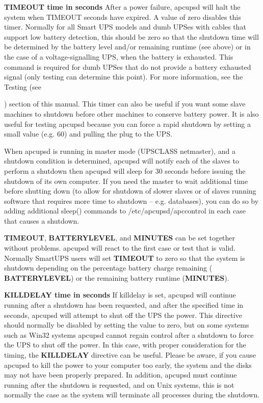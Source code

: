 {{{{{{{\begin{description}
\item {\bf TIMEOUT \lt{}time in seconds\gt{}}
   After a power failure, apcupsd will halt the system when TIMEOUT seconds have
expired.  A value of zero disables this timer. Normally for all Smart UPS
models and dumb UPSes with cables that support low battery detection, this
should be zero so that the shutdown time will be determined by the battery
level and/or remaining runtime (see above) or in the case of a
voltage-signalling UPS, when the battery is exhausted.  This command is
required for dumb UPSes that do not provide a battery exhausted signal (only
testing can determine this point).  For more information, see the Testing (see

) section of this manual. 
This timer can also be useful if you want some slave machines to shutdown
before other machines to conserve battery power.  It is also useful for
testing apcupsd because you can force a rapid shutdown by setting a small
value (e.g.  60) and pulling the plug to the UPS.  

When apcupsd is running in master mode (UPSCLASS netmaster), and a shutdown
condition is determined, apcupsd will notify each of the slaves to perform a
shutdown then apcupsd will sleep for 30 seconds before issuing the shutdown of
its own computer. If you need the master to wait additional time before
shutting down (to allow for shutdown of slower slaves or of slaves running
software that requires more time to shutdown {--} e.g. databases), you can do
so by adding additional sleep() commands to /etc/apcupsd/apccontrol in each
case that causes a shutdown.  

{\bf TIMEOUT}, {\bf BATTERYLEVEL}, and {\bf MINUTES} can be set together
without problems.  apcupsd will react to the first case or test that is valid.
Normally SmartUPS users will set {\bf TIMEOUT} to zero so that the system is
shutdown depending on the percentage battery charge remaining ({\bf
BATTERYLEVEL}) or the remaining battery runtime ({\bf MINUTES}).  

\label{KILLDELAY-_003ctime-in-seconds_003e}

\item {\bf KILLDELAY \lt{}time in seconds\gt{}}
   If killdelay is set, apcupsd will continue running after a shutdown has been
requested, and after the specified time in seconds, apcupsd will attempt to
shut off the UPS the power. This directive should normally be disabled by
setting the value to zero, but on some systems such as Win32 systems apcupsd
cannot regain control after a shutdown to force the UPS to shut off the power.
In this case, with proper consideration for the timing, the {\bf KILLDELAY}
directive can be useful.  Please be aware, if you cause apcupsd to kill the
power to your computer too early, the system and the disks may not have been
properly prepared.  In addition, apcupsd must continue running after the
shutdown is requested, and on Unix systems, this is not normally the case as
the system will terminate all processes during the shutdown.  
\end{description}

}}}}}}}
